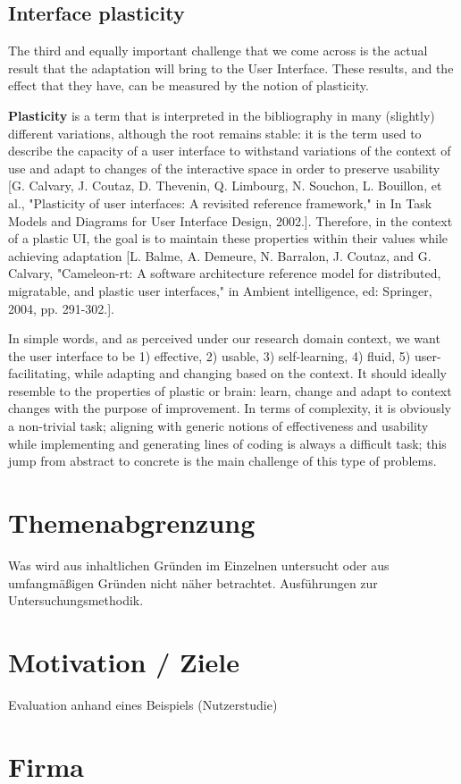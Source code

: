 \subsection{Interface plasticity} %
The third and equally important challenge that we come across is the actual result that the adaptation will bring to the User Interface.
These results, and the effect that they have, can be measured by the notion of plasticity.

\textbf{Plasticity} is a term that is interpreted in the bibliography in many (slightly) different variations,
although the root remains stable: it is the term used to describe the capacity of a user interface to withstand variations %
of the context of use and adapt to changes of the interactive space in order to preserve usability [G. Calvary, J. Coutaz, D. Thevenin, Q. Limbourg, N. Souchon, L. Bouillon, et al., "Plasticity of user interfaces: A revisited reference framework," in In Task Models and Diagrams for User Interface Design, 2002.].
Therefore, in the context of a plastic UI, the goal is to maintain these properties within their values while achieving adaptation [L. Balme, A. Demeure, N. Barralon, J. Coutaz, and G. Calvary, "Cameleon-rt: A software architecture reference model for distributed, migratable, and plastic user interfaces," in Ambient intelligence, ed: Springer, 2004, pp. 291-302.].

In simple words, and as perceived under our research domain context, we want the user interface to be
1) effective,
2) usable,
3) self-learning,
4) fluid,
5) user-facilitating,
while adapting and changing based on the context. It should ideally resemble to the properties of plastic or brain:
learn, change and adapt to context changes with the purpose of improvement.
In terms of complexity, it is obviously a non-trivial task; aligning with generic notions of effectiveness and usability
while implementing and generating lines of coding is always a difficult task; this jump from abstract to concrete is
the main challenge of this type of problems.

\section{Themenabgrenzung}
Was wird aus inhaltlichen Gründen im Einzelnen untersucht oder aus umfangmäßigen Gründen nicht näher betrachtet. Ausführungen zur Untersuchungsmethodik.

\section{Motivation / Ziele}
Evaluation anhand eines Beispiels (Nutzerstudie)
\section{Firma}